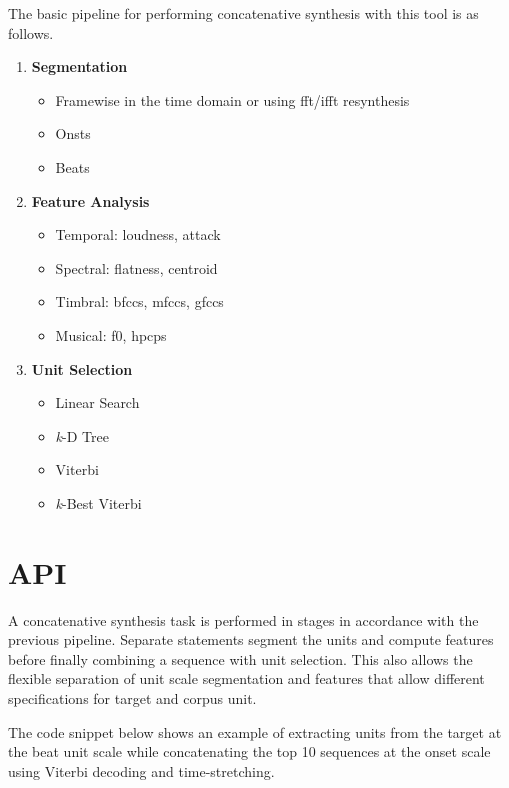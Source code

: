 The basic pipeline for performing concatenative synthesis with this tool is as follows.

\begin{enumerate}
  \item \textbf{Segmentation}
\begin{itemize}
  \item Framewise in the time domain or using \acrshort{fft}/\acrshort{ifft} resynthesis 
  \item Onsts
  \item Beats
\end{itemize}
\item \textbf{Feature Analysis}
\begin{itemize}
\item Temporal: loudness, attack
\item Spectral: flatness, centroid
\item Timbral: \acrshort{bfcc}s, \acrshort{mfcc}s, \acrshort{gfcc}s
\item Musical: f0, \acrshort{hpcp}s
\end{itemize}
\item \textbf{Unit Selection}
\begin{itemize}
  \item Linear Search
  \item \textit{k}-D Tree
  \item Viterbi
  \item \textit{k}-Best Viterbi
\end{itemize}
\end{enumerate}

\section{API}

A concatenative synthesis task is performed in stages in accordance with the previous pipeline. Separate statements segment the units and compute features before finally combining a sequence with unit selection. This also allows the flexible separation of unit scale segmentation and features that allow different specifications for target and corpus unit. 

The code snippet below shows an example of extracting units from the target at the beat unit scale while concatenating the top 10 sequences at the onset scale using Viterbi decoding and time-stretching.

